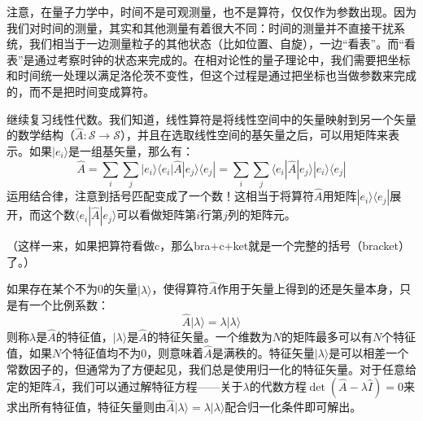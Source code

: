 \documentclass{ctexart}
\begin{document}
注意，在量子力学中，时间不是可观测量，也不是算符，仅仅作为参数出现。因为我们对时间的测量，其实和其他测量有着很大不同：时间的测量并不直接干扰系统，我们相当于一边测量粒子的其他状态（比如位置、自旋），一边“看表”。而“看表”是通过考察时钟的状态来完成的。在相对论性的量子理论中，我们需要把坐标和时间统一处理以满足洛伦茨不变性，但这个过程是通过把坐标也当做参数来完成的，而不是把时间变成算符。

继续复习线性代数。我们知道，线性算符是将线性空间中的矢量映射到另一个矢量的数学结构（$\hat{A}:\mathcal{S}\to\mathcal{S}$），并且在选取线性空间的基矢量之后，可以用矩阵来表示。如果$|e_i\rangle$是一组基矢量，那么有：
\begin{equation}
\hat{A}=\sum_i\sum_j|e_i\rangle\langle e_i|\hat{A}|e_j\rangle\langle e_j|=\sum_i\sum_j\langle e_i|\hat{A}|e_j\rangle|e_i\rangle\langle e_j|
\end{equation}
运用结合律，注意到括号匹配变成了一个数！这相当于将算符$\hat{A}$用矩阵$|e_i\rangle\langle e_j|$展开，而这个数$\langle e_i|\hat{A}|e_j\rangle$可以看做矩阵第$i$行第$j$列的矩阵元。

（这样一来，如果把算符看做c，那么bra+c+ket就是一个完整的括号（bracket）了。）

如果存在某个不为0的矢量$|\lambda\rangle$，使得算符$\hat{A}$作用于矢量上得到的还是矢量本身，只是有一个比例系数：
\begin{equation}
\hat{A}|\lambda\rangle=\lambda|\lambda\rangle
\end{equation}
则称$\lambda$是$\hat{A}$的特征值，$|\lambda\rangle$是$\hat{A}$的特征矢量。一个维数为$N$的矩阵最多可以有$N$个特征值，如果$N$个特征值均不为0，则意味着$\hat{A}$是满秩的。特征矢量$|\lambda\rangle$是可以相差一个常数因子的，但通常为了方便起见，我们总是使用归一化的特征矢量。对于任意给定的矩阵$\hat{A}$，我们可以通过解特征方程——关于$\lambda$的代数方程$\det(\hat{A}-\lambda\hat{I})=0$来求出所有特征值，特征矢量则由$\hat{A}|\lambda\rangle=\lambda|\lambda\rangle$配合归一化条件即可解出。
\end{document}
